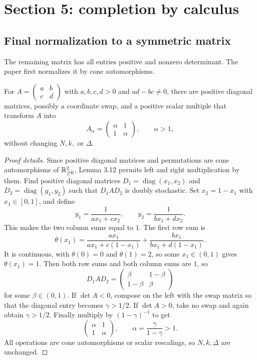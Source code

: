 \section{Section 5: completion by calculus}

\subsection{Final normalization to a symmetric matrix}
The remaining matrix has all entries positive and nonzero determinant.
The paper first normalizes it by cone automorphisms.

\begin{lemma}
For $A=\begin{pmatrix}a&b\\c&d\end{pmatrix}$ with $a,b,c,d>0$ and $ad-bc\ne0$, there are positive diagonal matrices, possibly a coordinate swap, and a positive scalar multiple that transform $A$ into
\[
  A_\alpha=\begin{pmatrix}\alpha&1\\1&\alpha\end{pmatrix},
  \qquad \alpha>1,
\]
without changing $N,k,$ or $\Delta$.
\end{lemma}

\begin{proof}[Proof details]
Since positive diagonal matrices and permutations are cone automorphisms of $\mathbb{R}^2_{\ge0}$, Lemma 3.12 permits left and right multiplication by them.
Find positive diagonal matrices $D_1=\operatorname{diag}(x_1,x_2)$ and $D_2=\operatorname{diag}(y_1,y_2)$ such that $D_1AD_2$ is doubly stochastic.
Set $x_2=1-x_1$ with $x_1\in[0,1]$, and define
\[
  y_1=\frac{1}{a x_1+c x_2},
  \qquad
  y_2=\frac{1}{b x_1+d x_2}.
\]
This makes the two column sums equal to $1$.
The first row sum is
\[
  \theta(x_1)=
  \frac{a x_1}{a x_1+c(1-x_1)}+
  \frac{b x_1}{b x_1+d(1-x_1)}.
\]
It is continuous, with $\theta(0)=0$ and $\theta(1)=2$, so some $x_1\in(0,1)$ gives $\theta(x_1)=1$.
Then both row sums and both column sums are $1$, so
\[
  D_1AD_2=\begin{pmatrix}\beta&1-\beta\\1-\beta&\beta\end{pmatrix}
\]
for some $\beta\in(0,1)$.
If $\det A<0$, compose on the left with the swap matrix so that the diagonal entry becomes $\gamma>1/2$.
If $\det A>0$, take no swap and again obtain $\gamma>1/2$.
Finally multiply by $(1-\gamma)^{-1}$ to get
\[
  \begin{pmatrix}\alpha&1\\1&\alpha\end{pmatrix},
  \qquad
  \alpha=\frac{\gamma}{1-\gamma}>1.
\]
All operations are cone automorphisms or scalar rescalings, so $N,k,\Delta$ are unchanged.
\end{proof}

